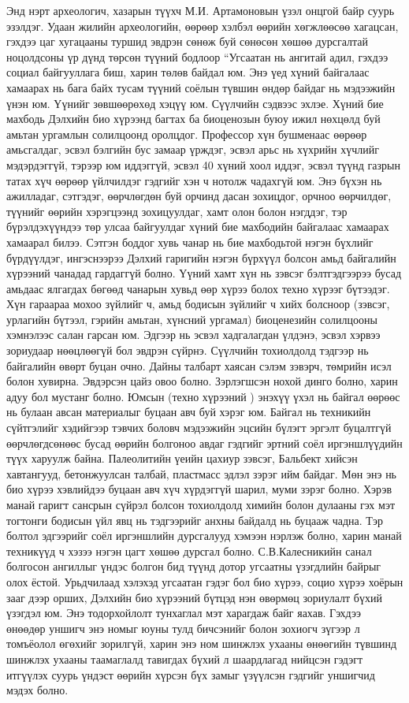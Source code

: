 Энд нэрт археологич, хазарын түүхч М.И. Артамоновын үзэл онцгой байр суурь эзэлдэг. Удаан жилийн археологийн, өөрөөр хэлбэл өөрийн хөгжлөөсөө хагацсан, гэхдээ цаг хугацааны туршид эвдрэн сөнөж буй сөнөсөн хөшөө дурсгалтай ноцолдсоны үр дүнд төрсөн түүний бодлоор “Угсаатан нь ангитай адил, гэхдээ социал байгууллага биш, харин төлөв байдал юм. Энэ үед хүний байгалаас хамаарах нь бага байх тусам түүний соёлын түвшин өндөр байдаг нь мэдээжийн үнэн юм. Үүнийг зөвшөөрөхөд хэцүү юм.
Сүүлчийн сэдвээс эхлэе. Хүний бие махбодь Дэлхийн био хүрээнд багтах ба биоценозын буюу ижил нөхцөлд буй амьтан ургамлын солилцоонд оролцдог. Профессор хүн бушменаас өөрөөр амьсгалдаг, эсвэл бэлгийн бус замаар үрждэг, эсвэл арьс нь хүхрийн хүчлийг мэдэрдэггүй, тэрээр юм иддэггүй, эсвэл 40 хүний хоол иддэг, эсвэл түүнд газрын татах хүч өөрөөр үйлчилдэг гэдгийг хэн ч нотолж чадахгүй юм.
Энэ бүхэн нь ажилладаг, сэтгэдэг, өөрчлөгдөн буй орчинд дасан зохицдог, орчноо өөрчилдөг, түүнийг өөрийн хэрэгцээнд зохицуулдаг, хамт олон болон нэгддэг, тэр бүрэлдэхүүндээ төр улсаа байгуулдаг хүний бие махбодийн байгалаас хамаарах хамаарал билээ. Сэтгэн боддог хувь чанар нь бие махбодьтой нэгэн бүхлийг бүрдүүлдэг, ингэснээрээ Дэлхий гаригийн нэгэн бүрхүүл болсон амьд байгалийн хүрээний чанадад гардаггүй болно. Үүний хамт хүн нь зэвсэг бэлтгэдгээрээ бусад амьдаас ялгагдах бөгөөд чанарын хувьд өөр хүрээ болох техно хүрээг бүтээдэг.
Хүн гараараа мохоо зүйлийг ч, амьд бодисын зүйлийг ч хийх болсноор (зэвсэг, урлагийн бүтээл, гэрийн амьтан, хүнсний ургамал) биоценезийн солилцооны хэмнэлээс салан гарсан юм. Эдгээр нь эсвэл хадгалагдан үлдэнэ, эсвэл хэрвээ зориудаар нөөцлөөгүй бол эвдрэн сүйрнэ. Сүүлчийн тохиолдолд тэдгээр нь байгалийн өвөрт буцан очно. Дайны талбарт хаясан сэлэм зэвэрч, төмрийн исэл болон хувирна. Эвдэрсэн цайз овоо болно. Зэрлэгшсэн нохой динго болно, харин адуу бол мустанг болно. Юмсын (техно хүрээний ) энэхүү үхэл нь байгал өөрөөс нь булаан авсан материалыг буцаан авч буй хэрэг юм. Байгал нь техникийн сүйтгэлийг хэдийгээр тэвчих боловч мэдээжийн эцсийн бүлэгт эргэлт буцалтгүй өөрчлөгдсөнөөс бусад өөрийн болгоноо авдаг гэдгийг эртний соёл иргэншлүүдийн түүх харуулж байна. Палеолитийн үеийн цахиур зэвсэг, Бальбект хийсэн хавтангууд, бетонжуулсан талбай, пластмасс эдлэл зэрэг ийм байдаг. Мөн энэ нь био хүрээ хэвлийдээ буцаан авч хүч хүрдэггүй шарил, муми зэрэг болно. Хэрэв манай гаригт сансрын сүйрэл болсон тохиолдолд химийн болон дулааны гэх мэт тогтонги бодисын үйл явц нь тэдгээрийг анхны байдалд нь буцааж чадна. Тэр болтол эдгээрийг соёл иргэншлийн дурсгалууд хэмээн нэрлэж болно, харин манай техникүүд ч хэзээ нэгэн цагт хөшөө дурсгал болно.
С.В.Калесникийн санал болгосон ангиллыг үндэс болгон бид түүнд дотор угсаатны үзэгдлийн байрыг олох ёстой. Урьдчилаад хэлэхэд угсаатан гэдэг бол био хүрээ, социо хүрээ хоёрын зааг дээр орших, Дэлхийн био хүрээний бүтцэд нэн өвөрмөц зориулалт бүхий үзэгдэл юм. Энэ тодорхойлолт тунхаглал мэт харагдаж байг яахав. Гэхдээ өнөөдөр уншигч энэ номыг юуны тулд бичсэнийг болон зохиогч зүгээр л томъёолол өгөхийг зорилгүй, харин энэ ном шинжлэх ухааны өнөөгийн түвшинд шинжлэх ухааны таамаглалд тавигдах бүхий л шаардлагад нийцсэн гэдэгт итгүүлэх суурь үндэст өөрийн хүрсэн бүх замыг үзүүлсэн гэдгийг уншигчид мэдэх болно.

